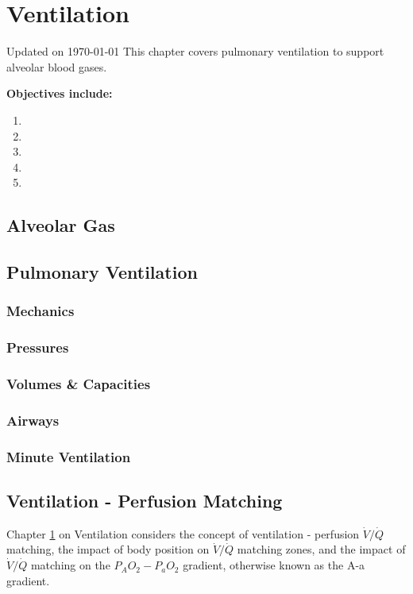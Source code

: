 \chapter{Ventilation}\label{chp:alveolar_oxygen}
Updated on \today
\minitoc
This chapter covers pulmonary ventilation to support alveolar blood gases.

\vspace{5mm}

\textbf{Objectives include:}
\begin{enumerate}
    \item
    \item
    \item
    \item
    \item
\end{enumerate}

\section{Alveolar Gas}

\section{Pulmonary Ventilation}

\subsection{Mechanics}

\subsection{Pressures}

\subsection{Volumes \& Capacities}

\subsection{Airways}

\subsection{Minute Ventilation}

\section{Ventilation - Perfusion Matching}
Chapter \ref{chp:alveolar_oxygen} on Ventilation considers the concept of ventilation - perfusion $\dot{V}/\dot{Q}$ matching, the impact of body position on $\dot{V}/\dot{Q}$ matching zones, and the impact of $\dot{V}/\dot{Q}$ matching on the $P_AO_2-P_aO_2$ gradient, otherwise known as the A-a gradient.
